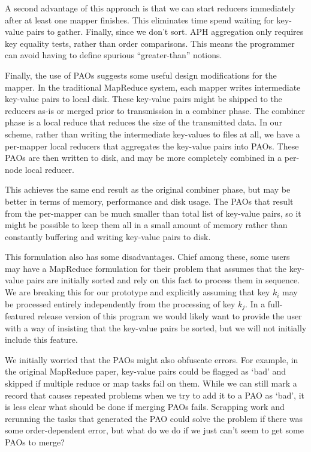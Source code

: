 \documentclass[10pt,letter,final,article,twocolumn]{article} %
\begin{document}
A second advantage of this approach is that we can start reducers immediately after at least one mapper finishes. This eliminates time spend waiting for key-value pairs to gather. Finally, since we don't sort. APH aggregation only requires key equality tests, rather than order comparisons. This means the programmer can avoid having to define spurious ``greater-than'' notions.

Finally, the use of PAOs suggests some useful design modifications for the mapper. In the traditional MapReduce system, each mapper writes intermediate key-value pairs to local disk. These key-value pairs might be shipped to the reducers as-is or merged prior to transmission in a combiner phase. The combiner phase is a local reduce that reduces the size of the transmitted data. In our scheme, rather than writing the intermediate key-values to files at all, we have a per-mapper local reducers that aggregates the key-value pairs into PAOs. These PAOs are then written to disk, and may be more completely combined in a per-node local reducer. 

This achieves the same end result as the original combiner phase, but may be better in terms of memory, performance and disk usage. The PAOs that result from the per-mapper can be much smaller than total list of key-value pairs, so it might be possible to keep them all in a small amount of memory rather than constantly buffering and writing key-value pairs to disk.

This formulation also has some disadvantages. Chief among these, some users may have a MapReduce formulation for their problem that assumes that the key-value pairs are initially sorted and rely on this fact to process them in sequence. We are breaking this for our prototype and explicitly assuming that key $k_i$ may be processed entirely independently from the processing of key $k_j$. In a full-featured release version of this program we would likely want to provide the user with a way of insisting that the key-value pairs be sorted, but we will not initially include this feature.

We initially worried that the PAOs might also obfuscate errors. For example, in the original MapReduce paper, key-value pairs could be flagged as `bad' and skipped if multiple reduce or map tasks fail on them. While we can still mark a record that causes repeated problems when we try to add it to a PAO as `bad', it is less clear what should be done if merging PAOs fails. Scrapping work and rerunning the tasks that generated the PAO could solve the problem if there was some order-dependent error, but what do we do if we just can't seem to get some PAOs to merge?
\end{document}

